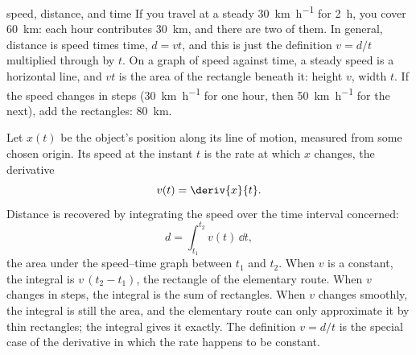 \begin{twoviews}{speed, distance, and time}
\elem If you travel at a steady \SI{30}{\kilo\metre\per\hour} for \SI{2}{\hour}, you cover \SI{60}{\kilo\metre}: each hour contributes \SI{30}{\kilo\metre}, and there are two of them. In general, distance is speed times time, $d = vt$, and this is just the definition $v = d/t$ multiplied through by $t$. On a graph of speed against time, a steady speed is a horizontal line, and $vt$ is the area of the rectangle beneath it: height $v$, width $t$. If the speed changes in steps (\SI{30}{\kilo\metre\per\hour} for one hour, then \SI{50}{\kilo\metre\per\hour} for the next), add the rectangles: \SI{80}{\kilo\metre}.

\calc Let $x(t)$ be the object's position along its line of motion, measured from some chosen origin. Its speed at the instant $t$ is the rate at which $x$ changes, the derivative
\[
v(t) = \deriv{x}{t}.
\]
Distance is recovered by integrating the speed over the time interval concerned:
\[
d = \int_{t_1}^{t_2} v(t)\,\dd t,
\]
the area under the speed--time graph between $t_1$ and $t_2$. When $v$ is a constant, the integral is $v\,(t_2 - t_1)$, the rectangle of the elementary route. When $v$ changes in steps, the integral is the sum of rectangles. When $v$ changes smoothly, the integral is still the area, and the elementary route can only approximate it by thin rectangles; the integral gives it exactly. The definition $v = d/t$ is the special case of the derivative in which the rate happens to be constant.
\end{twoviews}

